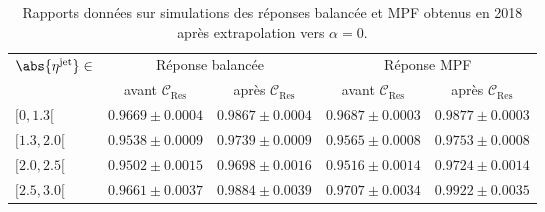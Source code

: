 \begin{table}[h]
\centering
\begin{tabular}{lcccc}
\toprule
\multirow{2}{*}{$\abs{\eta^\text{jet}}\in$} & \multicolumn{2}{c}{Réponse balancée} & \multicolumn{2}{c}{Réponse MPF} \\
\cmidrule(lr){2-3}\cmidrule(lr){4-5}
 & avant $\mathcal{C}_\text{Res}$ & après $\mathcal{C}_\text{Res}$ & avant $\mathcal{C}_\text{Res}$ & après $\mathcal{C}_\text{Res}$ \\
\midrule
$[\num{0}, \num{1.3}[$ & $\num{0.9669}\pm\num{0.0004}$ & $\num{0.9867}\pm\num{0.0004}$ & $\num{0.9687}\pm\num{0.0003}$ & $\num{0.9877}\pm\num{0.0003}$ \\
$[\num{1.3}, \num{2.0}[$ & $\num{0.9538}\pm\num{0.0009}$ & $\num{0.9739}\pm\num{0.0009}$ & $\num{0.9565}\pm\num{0.0008}$ & $\num{0.9753}\pm\num{0.0008}$ \\
$[\num{2.0}, \num{2.5}[$ & $\num{0.9502}\pm\num{0.0015}$ & $\num{0.9698}\pm\num{0.0016}$ & $\num{0.9516}\pm\num{0.0014}$ & $\num{0.9724}\pm\num{0.0014}$ \\
$[\num{2.5}, \num{3.0}[$ & $\num{0.9661}\pm\num{0.0037}$ & $\num{0.9884}\pm\num{0.0039}$ & $\num{0.9707}\pm\num{0.0034}$ & $\num{0.9922}\pm\num{0.0035}$ \\
\bottomrule
\end{tabular}
\caption[Rapports des réponses balancée et MPF obtenus en 2018 après extrapolation vers $\alpha=0$.]{Rapports données sur simulations des réponses balancée et MPF obtenus en 2018 après extrapolation vers $\alpha=0$.}
\label{tab-responses_recap_table_L2L3Res_cross_check_2018ABCD}
\end{table}